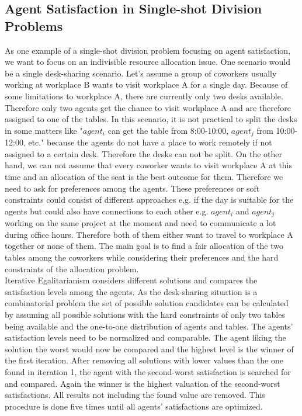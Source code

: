 \documentclass[german, a4paper, 11pt, oneside]{scrbook}
\begin{document}
\subsection{Agent Satisfaction in Single-shot Division Problems}
As one example of a single-shot division problem focusing on agent satisfaction, we want to focus on an indivisible resource allocation issue.
 One scenario would be a single desk-sharing scenario. Let's assume a group of coworkers usually working at workplace B wants to visit workplace A for a single day. Because of some limitations to workplace A, there are currently only two desks available. Therefore only two agents get the chance to visit workplace A and are therefore assigned to one of the tables. In this scenario, it is not practical to split the desks in some matters like "$agent_i$ can get the table from 8:00-10:00, $agent_j$ from 10:00-12:00, etc." because the agents do not have a place to work remotely if not assigned to a certain desk. Therefore the desks can not be split. On the other hand, we can not assume that every coworker wants to visit workplace A at this time and an allocation of the seat is the best outcome for them. Therefore we need to ask for preferences among the agents. These preferences or soft constraints could consist of different approaches e.g. if the day is suitable for the agents but could also have connections to each other e.g. $agent_i$ and $agent_j$ working on the same project at the moment and need to communicate a lot during office hours. Therefore both of them either want to travel to workplace A together or none of them. The main goal is to find a fair allocation of the two tables among the coworkers while considering their preferences and the hard constraints of the allocation problem.
\\Iterative Egalitarianism considers different solutions and compares the satisfaction levels among the agents. As the desk-sharing situation is a combinatorial problem the set of possible solution candidates can be calculated by assuming all possible solutions with the hard constraints of only two tables being available and the one-to-one distribution of agents and tables. The agents' satisfaction levels need to be normalized and comparable. The agent liking the solution the worst would now be compared and the highest level is the winner of the first iteration. After removing all solutions with lower values than the one found in iteration 1, the agent with the second-worst satisfaction is searched for and compared. Again the winner is the highest valuation of the second-worst satisfactions. All results not including the found value are removed. This procedure is done five times until all agents' satisfactions are optimized. 
\end{document}
